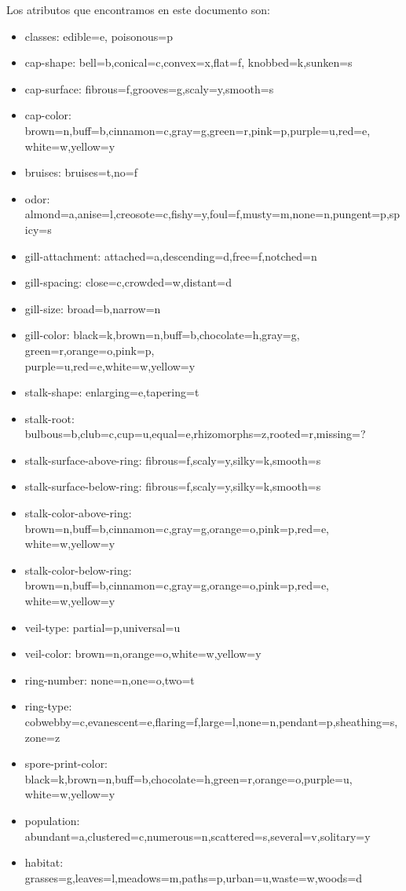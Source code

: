 \documentclass [a4paper] {article}
\begin{document}
\bigskip
Los atributos que encontramos en este documento son:
\begin{itemize}
\item classes: edible=e, poisonous=p
\item cap-shape: bell=b,conical=c,convex=x,flat=f, knobbed=k,sunken=s
\item cap-surface: fibrous=f,grooves=g,scaly=y,smooth=s
\item cap-color: brown=n,buff=b,cinnamon=c,gray=g,green=r,pink=p,purple=u,red=e,\\white=w,yellow=y
\item bruises: bruises=t,no=f
\item odor: almond=a,anise=l,creosote=c,fishy=y,foul=f,musty=m,none=n,pungent=p,spicy=s
\item gill-attachment: attached=a,descending=d,free=f,notched=n
\item gill-spacing: close=c,crowded=w,distant=d
\item gill-size: broad=b,narrow=n
\item gill-color: black=k,brown=n,buff=b,chocolate=h,gray=g, green=r,orange=o,pink=p,\\purple=u,red=e,white=w,yellow=y
\item stalk-shape: enlarging=e,tapering=t
\item stalk-root: bulbous=b,club=c,cup=u,equal=e,rhizomorphs=z,rooted=r,missing=?
\item stalk-surface-above-ring: fibrous=f,scaly=y,silky=k,smooth=s
\item stalk-surface-below-ring: fibrous=f,scaly=y,silky=k,smooth=s
\item stalk-color-above-ring: brown=n,buff=b,cinnamon=c,gray=g,orange=o,pink=p,red=e,\\white=w,yellow=y
\item stalk-color-below-ring: brown=n,buff=b,cinnamon=c,gray=g,orange=o,pink=p,red=e,\\white=w,yellow=y
\item veil-type: partial=p,universal=u
\item veil-color: brown=n,orange=o,white=w,yellow=y
\item ring-number: none=n,one=o,two=t
\item ring-type: cobwebby=c,evanescent=e,flaring=f,large=l,none=n,pendant=p,sheathing=s,zone=z
\item spore-print-color: black=k,brown=n,buff=b,chocolate=h,green=r,orange=o,purple=u,\\white=w,yellow=y
\item population: abundant=a,clustered=c,numerous=n,scattered=s,several=v,solitary=y
\item habitat: grasses=g,leaves=l,meadows=m,paths=p,urban=u,waste=w,woods=d
\end{itemize}
\end{document}
